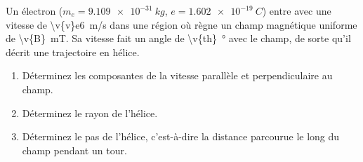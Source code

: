 Un électron ($m_e = \qty{9.109e-31}{kg}$, $e = \qty{1.602e-19}{C}$) entre avec une vitesse de \qty{\v{v}e6}{m/s} dans une région où règne un champ magnétique uniforme de \qty{\v{B}}{mT}. Sa vitesse fait un angle de \qty{\v{th}}{\degree} avec le champ, de sorte qu'il décrit une trajectoire en hélice.

\begin{enumerate}[label=\alph*)]
    \item Déterminez les composantes de la vitesse parallèle et perpendiculaire au champ.
    \item Déterminez le rayon de l'hélice.
    \item Déterminez le pas de l'hélice, c'est-à-dire la distance parcourue le long du champ pendant un tour.
\end{enumerate}
